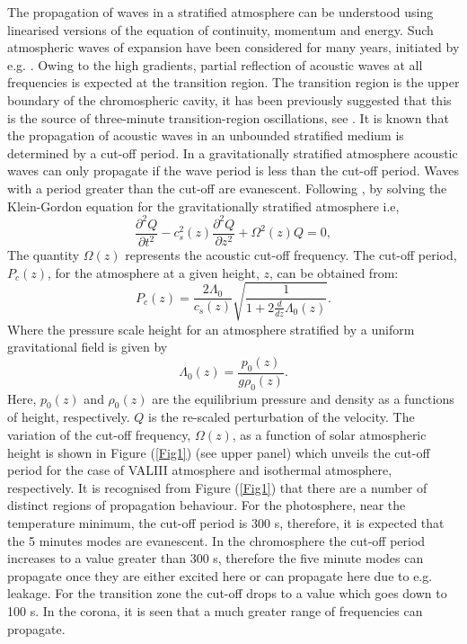 \documentclass[preprint,authoryear,12pt]{elsarticle}
\begin{document}
The propagation of waves in a stratified atmosphere can be understood using linearised versions of the 
equation of continuity, momentum and energy. Such atmospheric waves of expansion have been 
considered for many years, initiated by e.g. \citet{Lamb1932}. Owing to the high gradients, partial 
reflection of acoustic waves at all frequencies is expected at the transition region. The transition region 
is the upper boundary of the chromospheric cavity, it has been previously suggested that this is the source 
of three-minute transition-region oscillations, see \citet{Leibacher1971}. It is known that the propagation of 
acoustic waves in an unbounded stratified medium is determined by a cut-off period. In a gravitationally 
stratified atmosphere acoustic waves can only propagate if the wave period is less than the cut-off period. 
Waves with a period greater than the cut-off are evanescent. Following \citet{Taroyan2008}, by solving the 
Klein-Gordon equation for the gravitationally stratified atmosphere i.e, 
$$
\frac{\partial^2 Q}{\partial t^2} - c_s^2(z) \frac{\partial^2 Q}{\partial z^2} + \Omega^2(z)Q = 0,
$$
The quantity $\Omega(z)$ represents the acoustic cut-off frequency. The cut-off period, $P_{c}(z)$, for the atmosphere at a given height, $z$, can be obtained from:
$$
P_{c}(z)=\frac{2\Lambda_0   }{ c_{s}(z)}   \sqrt{\frac{1}{1+2\frac{d}{dz}\Lambda_0(z)}}.
$$
Where the pressure scale height for an atmosphere stratified by a uniform gravitational field is given by
$$
\Lambda_0(z)=\frac{p_0(z)}{g\rho_0(z)}.
$$
Here, $p_0(z)$ and $\rho_0(z)$ are the equilibrium pressure and density as a functions of height, respectively. $Q$ is the 
re-scaled perturbation of the velocity. The variation of the cut-off frequency, $\Omega(z)$, as a function of solar atmospheric height is shown in 
Figure (\ref{Fig1}) (see upper panel) which unveils the cut-off period for the case of VALIII atmosphere and isothermal 
atmosphere, respectively. It is recognised from Figure (\ref{Fig1}) that there are a number of distinct 
regions of propagation behaviour. For the photosphere, near the temperature minimum, the cut-off period is 300 s, therefore, 
it is expected that the 5 minutes modes are evanescent. In the chromosphere the cut-off period increases to a value greater than 300 s, 
therefore the five minute modes can propagate once they are either excited here or can propagate here due to e.g. leakage. For the transition zone the cut-off drops to a value which goes down to 100 s. In the corona, it is seen that a much greater range of frequencies can propagate.
\end{document}
